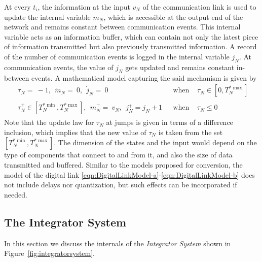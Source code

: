 \documentclass{article}
\begin{document}
\begin{enumerate}
At every $t_i$, the information at the input $v_N$ of the
communication link is used to update the internal variable 
$m_N$, which is accessible at the output end of the network
and remains constant between communication events.
This internal variable acts as an information buffer, which
can contain not only the latest piece of information transmitted
but also previously transmitted information.
A record of the number of communication events is logged in the internal variable $j_N$. 
At communication events, the value of $j_N$ gets updated 
and remains constant in-between events. 
A mathematical model capturing the said mechanism is given by
\begin{eqnarray}\label{eqn:DigitalLinkModel-a}
\left.
\begin{array}{l}
\dot{\tau}_N =\ -1,   \ \
\dot{m}_N  =\ 0,   \ \
\dot{j}_N =\ 0
\end{array}
\right. & \mbox{ when }& \tau_N \in [0,T^{*\max}_{N}] \\ 
\label{eqn:DigitalLinkModel-b}
\left.
\begin{array}{ll}
\tau_N^+  \in [T^{*\min}_{N},T^{*\max}_{N}],  \ \
m_N^+ =\ v_N,  \ \
j_N^+ = j_N+1
\end{array}
\right. & \mbox{ when }& \tau_N \leq 0
\end{eqnarray}
Note that the update law for $\tau_N$ at jumps is given in terms of a difference inclusion,
which implies that the new value of $\tau_N$ is taken from the set $[T^{*\min}_{N},T^{*\max}_{N}]$.
The dimension of the states and the input would depend on 
the type of components that connect to and from it, and also the size of data transmitted and buffered.
Similar to the models proposed for conversion, 
the model of the digital link \eqref{eqn:DigitalLinkModel-a}-\eqref{eqn:DigitalLinkModel-b}
does not include delays nor quantization, but such effects can be incorporated if needed.
\medskip


\end{enumerate}

\subsection{The Integrator System}
\label{sec:integratorsystem}
In this section we discuss the internals of the {\em Integrator System} shown in Figure~\ref{fig:integratorsystem}.
\end{document}
